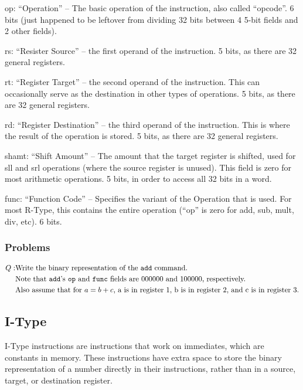 \documentclass{article}
\begin{document}
op: ``Operation'' -- The basic operation of the instruction, also called ``opcode''. 6 bits (just happened to be leftover from dividing 32 bits between 4 5-bit fields and 2 other fields).

rs: ``Resister Source'' -- the first operand of the instruction. 5 bits, as there are 32 general registers. 

rt: ``Register Target'' -- the second operand of the instruction. This can occasionally serve as the destination in other types of operations. 5 bits, as there are 32 general registers. 

rd: ``Register Destination'' -- the third operand of the instruction. This is where the result of the operation is stored. 5 bits, as there are 32 general registers. 

shamt: ``Shift Amount'' -- The amount that the target register is shifted, used for sll and srl operations (where the source register is unused). This field is zero for most arithmetic operations. 5 bits, in order to access all 32 bits in a word.

func: ``Function Code'' -- Specifies the variant of the Operation that is used. For most R-Type, this contains the entire operation (``op'' is zero for add, sub, mult, div, etc). 6 bits.

\subsubsection{Problems}\label{RTypeProblems}

\begin{equation}\label{RType1}
\begin{aligned}
    Q: & \text{Write the binary representation of the \texttt{add} command.}\\
    & \text{Note that \texttt{add}'s \texttt{op} and \texttt{func} fields are 000000 and 100000, respectively.}\\
    & \text{Also assume that for } a = b + c \text{, a is in register 1, b is in register 2, and c is in register 3.}
\end{aligned}
\end{equation}

\subsection{I-Type}\label{IType}

I-Type instructions are instructions that work on immediates, which are constants in memory. These instructions have extra space to store the binary representation of a number directly in their instructions, rather than in a source, target, or destination register. 
\end{document}
